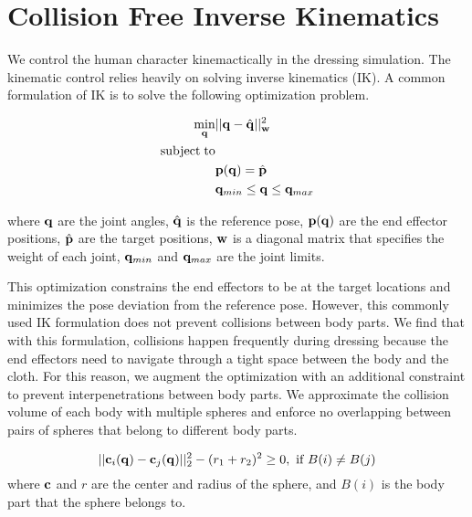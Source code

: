 \section{Collision Free Inverse Kinematics}

We control the human character kinemactically in the dressing simulation. The kinematic control relies heavily on solving inverse kinematics (IK). A common formulation of IK is to solve the following optimization problem.

\begin{align}
\label{eq:IK}
  \min_{\mathbf{q}} & ||\mathbf{q} - \hat{\mathbf{q}}||_{\mathbf{w}}^2 \\
  \nonumber  \mathrm{subject\;} \mathrm{to} & \\
  \nonumber  &\mathbf{p}(\mathbf{q}) = \hat{\mathbf{p}}\\
\nonumber   &\mathbf{q}_{min} \leq \mathbf{q} \leq \mathbf{q}_{max}
\end{align}

where $\mathbf{q}$ are the joint angles, $\hat{\mathbf{q}}$ is the reference pose, $\mathbf{p}(\mathbf{q})$ are the end effector positions, $\hat{\mathbf{p}}$ are the target positions, $\mathbf{w}$ is a diagonal matrix that specifies the weight of each joint, $\mathbf{q}_{min}$ and $\mathbf{q}_{max}$ are the joint limits.

This optimization constrains the end effectors to be at the target locations and minimizes the pose deviation from the reference pose. However, this commonly used IK formulation does not prevent collisions between body parts. We find that with this formulation, collisions happen frequently during dressing because the end effectors need to navigate through a tight space between the body and the cloth. For this reason, we augment the optimization with an additional constraint to prevent interpenetrations between body parts. We approximate the collision volume of each body with multiple spheres and enforce no overlapping between pairs of spheres that belong to different body parts.

\begin{equation}
  ||\mathbf{c}_i(\mathbf{q}) - \mathbf{c}_j(\mathbf{q})||_2^2 - (r_1 + r_2)^2 \geq 0,\mbox{ if }B(i) \neq B(j)
  \label{eq:collision}
\end{equation}
where $\mathbf{c}$ and $r$ are the center and radius of the sphere, and $B(i)$ is the body part that the sphere belongs to.

